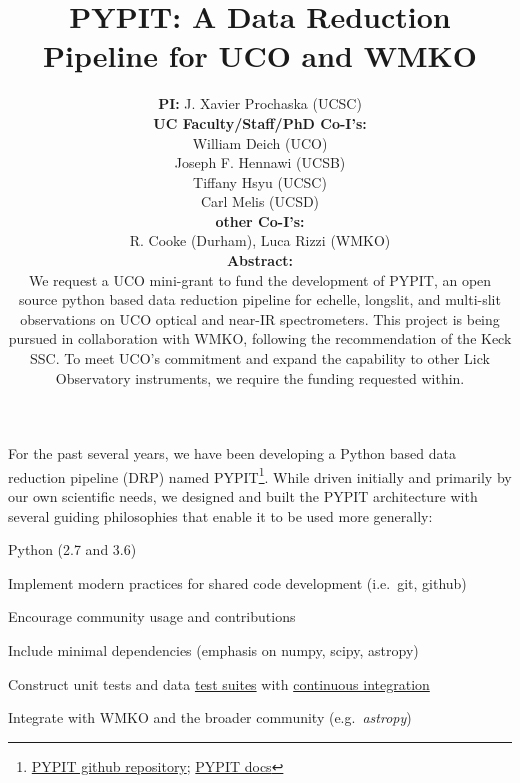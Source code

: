 \documentclass[12pt,preprint]{aastex}
\title{{\Large PYPIT:  A Data Reduction Pipeline for UCO and WMKO}}
\author{
{\bf PI:} 
J. Xavier Prochaska (UCSC) \\
\vskip 0.1in
{\bf UC Faculty/Staff/PhD Co-I's:} \\
William Deich (UCO) \\
Joseph F. Hennawi (UCSB) \\
Tiffany Hsyu (UCSC) \\
Carl Melis (UCSD) \\
\vskip 0.1in
\vskip 0.1in
{\bf other Co-I's:} \\
R. Cooke (Durham), Luca Rizzi (WMKO) \\
\vskip 0.3in
{\bf Abstract:} \\
We request a UCO mini-grant to fund the development of PYPIT,
an open source python based data reduction pipeline for echelle, longslit, and multi-slit
observations on UCO optical and near-IR spectrometers.
This project is being pursued in collaboration with WMKO,
following the recommendation of the Keck SSC.
To meet UCO's commitment and expand the capability
to other Lick Observatory instruments, we require the
funding requested within.
}
\newenvironment{my_itemize}{
\begin{itemize}
  \setlength{\itemsep}{1pt}
  \setlength{\parskip}{0pt}
  \setlength{\parsep}{0pt}}{\end{itemize}
}
\begin{document}
\maketitle

	\pagestyle{myheadings}    %




 For the past several years, we have been developing a Python
based data reduction pipeline (DRP) named PYPIT\footnote{
\href{https://github.com/PYPIT/PYPIT}{PYPIT github repository};
\href{http://pypit.readthedocs.io/en/latest/}{PYPIT docs}}.
While driven initially and primarily by our own scientific
needs, we designed and built the PYPIT architecture
with several guiding philosophies that enable it to be used more generally:

\vskip -0.2in

\begin{my_itemize}
\item Python (2.7 and 3.6)
\item Implement modern practices for shared code development 
(i.e.\ git, github)
\item Encourage community usage and contributions
\item Include minimal dependencies (emphasis on numpy, scipy, astropy)
\item Construct unit tests and data
\href{https://github.com/PYPIT/PYPIT-development-suite}{test suites}
with 
\href{https://travis-ci.org/PYPIT/PYPIT/}{continuous integration}
\item Integrate with WMKO and the broader community (e.g.\ {\it astropy})
\end{my_itemize}

\vskip -0.1in
\end{document}
